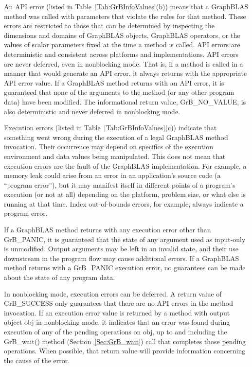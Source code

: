An API error (listed in Table~\ref{Tab:GrBInfoValues}(b)) means that a GraphBLAS 
method was called with parameters
that violate the rules for that method.  These errors are restricted
to those that can be determined by inspecting the dimensions and domains of
GraphBLAS objects, GraphBLAS operators, or the values of scalar parameters
fixed at the time a method is called.  API errors are deterministic and
consistent across platforms and implementations.  API errors are never
deferred, even in nonblocking mode. That is, if a method is called in
a manner that would generate an API error, it always returns with the
appropriate API error value.  If a GraphBLAS method returns with an
API error, it is guaranteed that none of the arguments to the method
(or any other program data) have been modified.  The informational return
value, {\sf GrB\_NO\_VALUE}, is also deterministic and never deferred in 
nonblocking mode.

Execution errors (listed in Table~\ref{Tab:GrBInfoValues}(c)) indicate that 
something went wrong during the execution
of a legal GraphBLAS method invocation.  Their occurrence may depend on
specifics of the execution environment and data values being manipulated.
This does not mean that execution errors are the fault of the GraphBLAS
implementation.  For example, a memory leak could arise from an error in
an application's source code (a ``program error''), but it may manifest
itself in different points of a program's execution (or not at all)
depending on the platform, problem size, or what else is running at
that time.  Index out-of-bounds errors, for example, always indicate a
program error.

If a GraphBLAS method returns with any execution error other than 
{\sf GrB\_PANIC}, it is guaranteed that the state of any argument used as 
input-only is unmodified.  Output arguments may be left in an invalid state, 
and their use downstream in the program flow may cause additional errors.  If a 
GraphBLAS method returns with a {\sf GrB\_PANIC} execution error, no guarantees 
can be made about the state of any program data. 

In nonblocking mode, execution errors can be deferred.  A return value
of {\sf GrB\_SUCCESS} only guarantees that there are no API errors
in the method invocation.  If an execution error value is returned
by a method with output object {\sf obj} in nonblocking mode, it
indicates that an error was found during execution of any of the pending
operations on {\sf obj}, up to and including the {\sf GrB\_wait()} method
(Section~\ref{Sec:GrB_wait}) call that completes those pending operations.
When possible, that return value will provide information concerning
the cause of the error.

